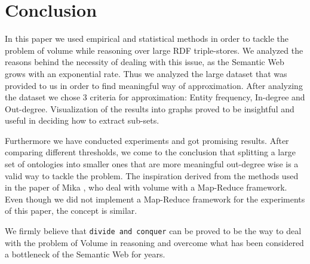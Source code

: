 \documentclass[runningheads,a4paper]{../../StyleFiles/llncs}
\begin{document}
\section{Conclusion}
In this paper we used empirical and statistical methods in order to tackle the problem of volume while reasoning over large RDF triple-stores. We analyzed the reasons behind the necessity of dealing with this issue, as the Semantic Web grows with an exponential rate. Thus we analyzed the large dataset that was provided to us in order to find meaningful way of approximation. After analyzing the dataset we chose 3 criteria for approximation: Entity frequency, In-degree and Out-degree. Visualization of the results into graphs proved to be insightful and useful in deciding how to extract sub-sets. 

Furthermore we have conducted experiments and got promising results. After comparing different thresholds, we come to the conclusion that splitting a large set of ontologies into smaller ones that are more meaningful out-degree wise is a valid way to tackle the problem. The inspiration derived from the methods used in the paper of Mika \cite{mika2008web}, who deal with volume with a Map-Reduce framework. Even though we did not implement a Map-Reduce framework for the experiments of this paper, the concept is similar. 

We firmly believe that \texttt{divide and conquer}  can be proved to be the way to deal with the problem of Volume in reasoning and overcome what has been considered a bottleneck of the Semantic Web for years.



\end{document}
